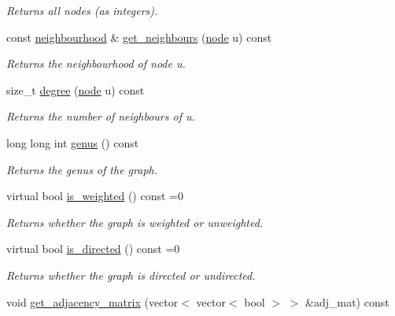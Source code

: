 \begin{DoxyCompactItemize}
\begin{DoxyCompactList}\small\item\em Returns all nodes (as integers). \end{DoxyCompactList}\item 
const \hyperlink{namespacelgraph_1_1utils_a0f2ef47028a466d26841709e705390ac}{neighbourhood} \& \hyperlink{classlgraph_1_1utils_1_1xxgraph_a2c5332c4663c2d52828893f095a68202}{get\-\_\-neighbours} (\hyperlink{namespacelgraph_1_1utils_a7bd66ede3805ef121bc2835bd48de0cf}{node} u) const 
\begin{DoxyCompactList}\small\item\em Returns the neighbourhood of node u. \end{DoxyCompactList}\item 
size\-\_\-t \hyperlink{classlgraph_1_1utils_1_1xxgraph_af588aa4c68004a31aa143024cdb6dcc9}{degree} (\hyperlink{namespacelgraph_1_1utils_a7bd66ede3805ef121bc2835bd48de0cf}{node} u) const 
\begin{DoxyCompactList}\small\item\em Returns the number of neighbours of u. \end{DoxyCompactList}\item 
long long int \hyperlink{classlgraph_1_1utils_1_1xxgraph_ade9c0fcadaa904181d2ea3031488c2e3}{genus} () const 
\begin{DoxyCompactList}\small\item\em Returns the genus of the graph. \end{DoxyCompactList}\item 
virtual bool \hyperlink{classlgraph_1_1utils_1_1xxgraph_a470b3fa2d6e37914d383de7d44f649e0}{is\-\_\-weighted} () const =0
\begin{DoxyCompactList}\small\item\em Returns whether the graph is weighted or unweighted. \end{DoxyCompactList}\item 
virtual bool \hyperlink{classlgraph_1_1utils_1_1xxgraph_a154376b6e55c4654622eb17ce738b5bb}{is\-\_\-directed} () const =0
\begin{DoxyCompactList}\small\item\em Returns whether the graph is directed or undirected. \end{DoxyCompactList}\item 
\hypertarget{classlgraph_1_1utils_1_1xxgraph_a401454762f6b4b69f13ab0a10729c457}{void \hyperlink{classlgraph_1_1utils_1_1xxgraph_a401454762f6b4b69f13ab0a10729c457}{get\-\_\-adjacency\-\_\-matrix} (vector$<$ vector$<$ bool $>$ $>$ \&adj\-\_\-mat) const }\label{classlgraph_1_1utils_1_1xxgraph_a401454762f6b4b69f13ab0a10729c457}


\end{DoxyCompactItemize}
